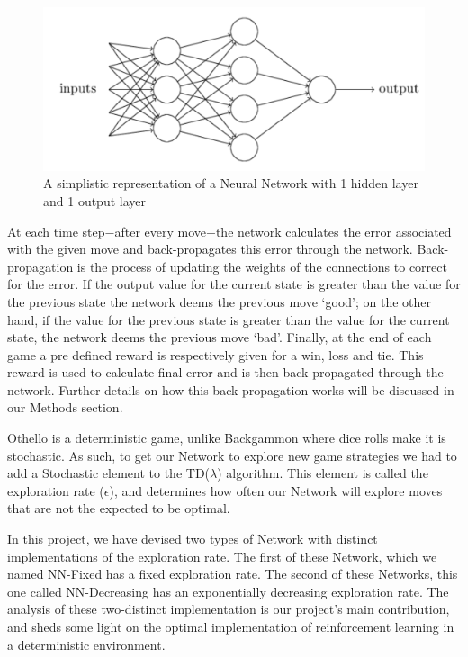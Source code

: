 \documentclass{sig-alternate-05-2015}
\begin{document}
\begin{figure}[h!]
  \includegraphics[width=\linewidth]{simpleNN.png}
  \caption{A simplistic representation of a Neural Network with 1 hidden layer and 1 output layer}
  \label{fig:simpleNN2}
\end{figure}

At each time step$-$after every move$-$the network calculates the error associated with the given move and back-propagates this error through the network. Back-propagation is the process of updating the weights of the connections to correct for the error. If the output value for the current state is greater than the value for the previous state the network deems the previous move `good'; on the other hand, if the value for the previous state is greater than the value for the current state, the network deems the previous move `bad'. Finally, at the end of each game a pre defined reward is respectively given for a win, loss and tie. This reward is used to calculate final error and is then back-propagated through the network. Further details on how this back-propagation works will be discussed in our Methods section. 

Othello is a deterministic game, unlike Backgammon where dice rolls make it is stochastic. As such, to get our Network to explore new game strategies we had to add a Stochastic element to the TD(\(\lambda\)) algorithm. This element is called the exploration rate (\(\epsilon\)), and determines how often our Network will explore moves that are not the expected to be optimal.

In this project, we have devised two types of Network with distinct implementations of the exploration rate. The first of these Network, which we named NN-Fixed has a fixed exploration rate. The second of these Networks, this one called NN-Decreasing has an exponentially decreasing exploration rate. The analysis of these two-distinct implementation is our project's main contribution, and sheds some light on the optimal implementation of reinforcement learning in a deterministic environment.
\end{document}
